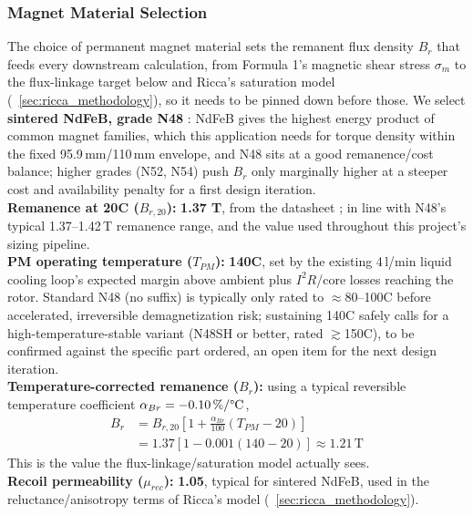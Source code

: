 \documentclass[10pt,final,journal,a4paper,oneside,twocolumn]{IEEEtran}
\begin{document}
\subsubsection{Magnet Material Selection}
\label{sec:magnet_material}
The choice of permanent magnet material sets the remanent flux density $B_r$ that feeds every downstream calculation, from Formula 1's magnetic shear stress $\sigma_m$ to the flux-linkage target below and Ricca's saturation model (\sectionname~\ref{sec:ricca_methodology}), so it needs to be pinned down before those. We select \textbf{sintered NdFeB, grade N48} \cite{ACHMagnetsN48}: NdFeB gives the highest energy product of common magnet families, which this application needs for torque density within the fixed 95.9\,mm/110\,mm envelope, and N48 sits at a good remanence/cost balance; higher grades (N52, N54) push $B_r$ only marginally higher at a steeper cost and availability penalty for a first design iteration.
\\\textbf{Remanence at 20\textdegree{}C ($B_{r,20}$):} \textbf{1.37 T}, from the datasheet \cite{ACHMagnetsN48}; in line with N48's typical 1.37--1.42\,T remanence range, and the value used throughout this project's sizing pipeline.
\\\textbf{PM operating temperature ($T_{PM}$):} \textbf{140\textdegree{}C}, set by the existing 4\,l/min liquid cooling loop's expected margin above ambient plus $I^2R$/core losses reaching the rotor. Standard N48 (no suffix) is typically only rated to $\approx$80--100\textdegree{}C before accelerated, irreversible demagnetization risk; sustaining 140\textdegree{}C safely calls for a high-temperature-stable variant (N48SH or better, rated $\gtrsim$150\textdegree{}C), to be confirmed against the specific part ordered, an open item for the next design iteration.
\\\textbf{Temperature-corrected remanence ($B_r$):} using a typical reversible temperature coefficient $\alpha_{Br}=-0.10\,\%/\text{\textdegree{}C}$,
\begin{equation}
\label{eq:br_derating}
\begin{split}
B_r &= B_{r,20}\left[1+\frac{\alpha_{Br}}{100}(T_{PM}-20)\right] \\
&= 1.37\left[1-0.001(140-20)\right] \approx 1.21\,\text{T}
\end{split}
\end{equation}
This is the value the flux-linkage/saturation model actually sees.
\\\textbf{Recoil permeability ($\mu_{rec}$):} \textbf{1.05}, typical for sintered NdFeB, used in the reluctance/anisotropy terms of Ricca's model (\sectionname~\ref{sec:ricca_methodology}).
\end{document}

